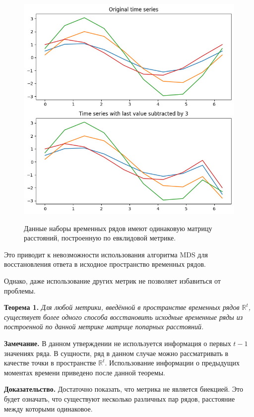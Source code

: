 \documentclass{article}
\begin{document}
\begin{figure}[H]
	\centering
	\includegraphics[width=\textwidth]{SameMatrix.jpg}
	\label{fig:fig1}
	\caption{Данные наборы временных рядов имеют одинаковую матрицу расстояний, построенную по евклидовой метрике.}
\end{figure}

Это приводит к невозможности использования алгоритма MDS для восстановления ответа в исходное пространство временных рядов.

Однако, даже использование других метрик не позволяет избавиться от проблемы.

\textbf{Теорема 1.} \textit{Для любой метрики, введённой в пространстве временных рядов $\mathbb{R}^t$, существует более одного способа восстановить исходные временные ряды из построенной по данной метрике матрице попарных расстояний.}

\textbf{Замечание.} В данном утверждении не используется информация о первых $t-1$ значениях ряда. В сущности, ряд в данном случае можно рассматривать в качестве точки в пространстве $\mathbb{R}^t$. Использование информации о предыдущих моментах времени приведено после данной теоремы.

\textbf{Доказательство.} Достаточно показать, что метрика не является биекцией. Это будет означать, что существуют несколько различных пар рядов, расстояние между которыми одинаковое.
\end{document}
